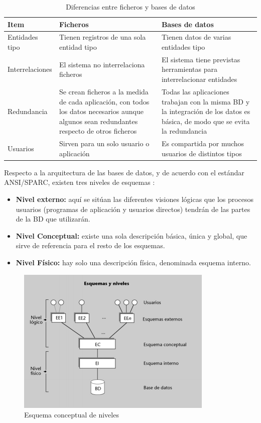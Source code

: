 \begin{table}[H]
\centering
\begin{tabular}{|p{3cm}|p{4cm}|p{4cm}|}
\hline
Item&Ficheros&Bases de datos \\
\hline
Entidades tipo&Tienen registros de una sola entidad tipo&Tienen datos de varias entidades tipo\\
\hline
Interrelaciones&El sistema no interrelaciona ficheros&El sistema tiene previstas herramientas para interrelacionar entidades\\
\hline
Redundancia& Se crean ficheros a la medida de cada aplicación, con todos los datos necesarios aunque algunos sean redundantes respecto de otros ficheros&Todas las aplicaciones trabajan con la misma BD y la integración de los datos es básica, de modo que se evita la redundancia\\
\hline
Usuarios& Sirven para un solo usuario o aplicación&Es compartida por muchos usuarios de distintos tipos \\
\hline

\end{tabular}
\caption{Diferencias entre ficheros y bases de datos \citep{camps2005}}
\end{table}

Respecto a la arquitectura de las bases de datos, y de acuerdo con el estándar ANSI/SPARC, existen tres niveles de esquemas \citep{camps2005}:

\begin{itemize}
\item \textbf{Nivel externo:} aquí se sitúan las diferentes visiones lógicas que los procesos usuarios (programas de aplicación y usuarios directos) tendrán de las partes de la BD que utilizarán.
\item \textbf{Nivel Conceptual:} existe una sola descripción básica, única y global, que sirve de referencia para el resto de los esquemas.
\item \textbf{Nivel Físico:} hay solo una descripción física, denominada esquema interno.
\end{itemize}

\begin{figure}[H]
\centering
\includegraphics[scale=0.9]{images/arqbd.png}
\caption{Esquema conceptual de niveles \citep{camps2005}}
\end{figure}

